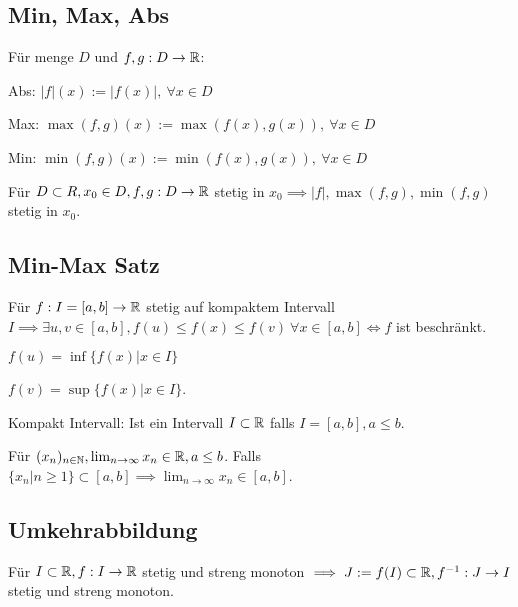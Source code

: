 \subsection{Min, Max, Abs}
Für menge $D$ und $f,g: D \to \mathbb{R}$:
\begin{compactdesc}
    \item[Abs:] $|f|(x) := |f(x)|, \ \forall x \in D$
    \item[Max:] $\max(f,g)(x) := \max(f(x), g(x)), \ \forall x \in D$
    \item[Min:] $\min(f,g)(x) := \min(f(x), g(x)), \ \forall x \in D$
\end{compactdesc}
\begin{compactitem}
    \item Für $D \subset R, x_0 \in D, f,g: D \to \mathbb{R}$ stetig in $x_0 \implies |f|, \max(f,g), \min(f,g)$ stetig in $x_0$.
\end{compactitem}

\subsection{Min-Max Satz}
Für $f:I = [a, b] \to \mathbb{R}$ stetig auf kompaktem Intervall $I \implies \exists u,v \in [a,b], f(u) \le f(x) \le f(v) \ \forall x \in [a,b] \iff f$ ist beschränkt.

\begin{inparaitem}
    \item $f(u) = \inf \{f(x) | x \in I\}$
    \item $f(v) = \sup \{f(x) | x \in I\}$.
\end{inparaitem}
\begin{compactdesc}
    \item[Kompakt Intervall:] Ist ein Intervall $I \subset \mathbb{R}$ falls $I = [a, b], a \le b$.
        \begin{compactitem}
        \item Für $(x_n)_{n \in \mathbb{N}}, \lim_{n \to \infty}x_n \in \mathbb{R}, a \le b$. Falls $\{x_n | n \ge 1\} \subset [a, b] \implies \lim_{n \to \infty}x_n \in [a, b]$.
        \end{compactitem}
\end{compactdesc}

\subsection{Umkehrabbildung}
Für $I \subset \mathbb{R}, f: I \to \mathbb{R}$ stetig und streng monoton $\implies J:=f(I) \subset \mathbb{R}, f^{-1}:  J \to I$ stetig und streng monoton.

